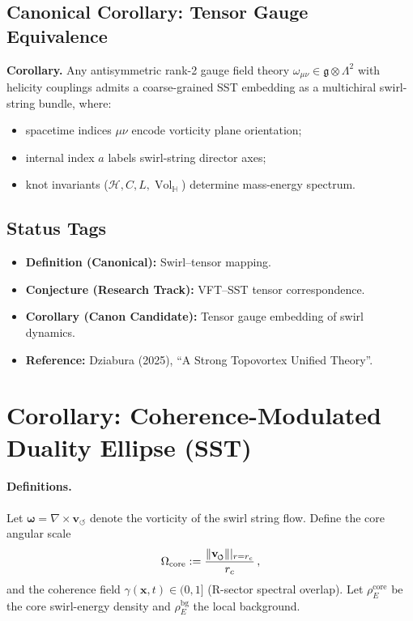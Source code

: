 \documentclass[10pt,reprint,aps,onecolumn,nofootinbib]{revtex4-2}
\newcommand{\vswirl}{\mathbf{v}_{\!\boldsymbol{\circlearrowleft}}}
\newcommand{\vnorm}{\lVert \mathbf{v}_{\mkern-2mu\scriptscriptstyle\boldsymbol{\circlearrowleft}} \rVert}               %
\newcommand{\rhoE}{\rho_{\!E}}                           %
\newcommand{\rc}{r_c}                                    %
\providecommand{\rc}{r_c}
\newcommand{\omegaVec}{\boldsymbol{\omega}}
\newcommand{\OmegaCore}{\Omega_{\mathrm{core}}}
\newcommand{\bg}{\mathrm{bg}}
\newcommand{\core}{\mathrm{core}}
\newcommand{\Vol}{\operatorname{Vol}}   %
\begin{document}
    \subsection*{Canonical Corollary: Tensor Gauge Equivalence}

        \textbf{Corollary.} Any antisymmetric rank-2 gauge field theory $\omega_{\mu\nu} \in \mathfrak{g} \otimes \Lambda^2$ with helicity couplings admits a coarse-grained SST embedding as a multichiral swirl-string bundle, where:
        \begin{itemize}
            \item spacetime indices $\mu\nu$ encode vorticity plane orientation;
            \item internal index $a$ labels swirl-string director axes;
            \item knot invariants ($\mathcal{H}, C, L, \Vol_{\!\mathbb{H}}$) determine mass-energy spectrum.
        \end{itemize}

    \subsection*{Status Tags}

        \begin{itemize}
            \item \textbf{Definition (Canonical):} Swirl–tensor mapping.
            \item \textbf{Conjecture (Research Track):} VFT–SST tensor correspondence.
            \item \textbf{Corollary (Canon Candidate):} Tensor gauge embedding of swirl dynamics.
            \item \textbf{Reference:} Dziabura (2025), “A Strong Topovortex Unified Theory”.
        \end{itemize}



    \section{Corollary: Coherence-Modulated Duality Ellipse (SST)}
    \label{sec:duality-ellipse-sst}

    \paragraph{Definitions.}
        Let $\omegaVec=\nabla\times\vswirl$ denote the vorticity of the swirl string flow.
        Define the core angular scale
        \begin{equation}
            \OmegaCore := \frac{\vnorm|_{r=\rc}}{\rc}\,,
        \end{equation}
        and the coherence field $\gamma(\mathbf x,t)\in(0,1]$ (R-sector spectral overlap).
        Let $\rhoE^{\core}$ be the core swirl-energy density and $\rhoE^{\bg}$ the local background.
\end{document}
